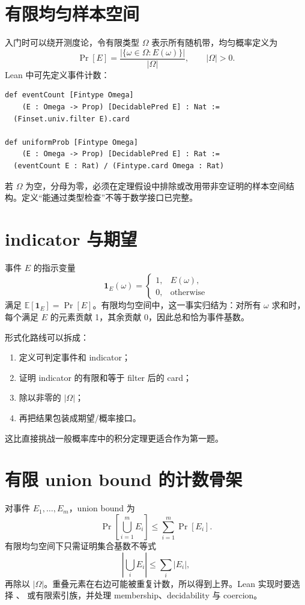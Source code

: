\section{有限均匀样本空间}

入门时可以绕开测度论，令有限类型 $\Omega$ 表示所有随机带，均匀概率定义为
\[
\Pr[E]=\frac{|\{\omega\in\Omega:E(\omega)\}|}{|\Omega|},
\qquad |\Omega|>0.
\]
Lean 中可先定义事件计数：
\begin{lstlisting}
def eventCount [Fintype Omega]
    (E : Omega -> Prop) [DecidablePred E] : Nat :=
  (Finset.univ.filter E).card

def uniformProb [Fintype Omega]
    (E : Omega -> Prop) [DecidablePred E] : Rat :=
  (eventCount E : Rat) / (Fintype.card Omega : Rat)
\end{lstlisting}
若 $\Omega$ 为空，分母为零，必须在定理假设中排除或改用带非空证明的样本空间结构。定义“能通过类型检查”不等于数学接口已完整。

\section{indicator 与期望}

事件 $E$ 的指示变量
\[
\mathbf{1}_E(\omega)=
\begin{cases}
1,&E(\omega),\\
0,&\text{otherwise}
\end{cases}
\]
满足 $\mathbb{E}[\mathbf{1}_E]=\Pr[E]$。有限均匀空间中，这一事实归结为：对所有 $\omega$ 求和时，每个满足 $E$ 的元素贡献 1，其余贡献 0，因此总和恰为事件基数。

形式化路线可以拆成：
\begin{enumerate}
  \item 定义可判定事件和 indicator；
  \item 证明 indicator 的有限和等于 filter 后的 card；
  \item 除以非零的 $|\Omega|$；
  \item 再把结果包装成期望/概率接口。
\end{enumerate}
这比直接挑战一般概率库中的积分定理更适合作为第一题。

\section{有限 union bound 的计数骨架}

对事件 $E_1,\ldots,E_m$，union bound 为
\[
\Pr\!\left[\bigcup_{i=1}^m E_i\right]
\le \sum_{i=1}^m \Pr[E_i].
\]
有限均匀空间下只需证明集合基数不等式
\[
\left|\bigcup_i E_i\right|\le\sum_i |E_i|,
\]
再除以 $|\Omega|$。重叠元素在右边可能被重复计数，所以得到上界。Lean 实现时要选择 、 或有限索引族，并处理 membership、decidability 与 coercion。

